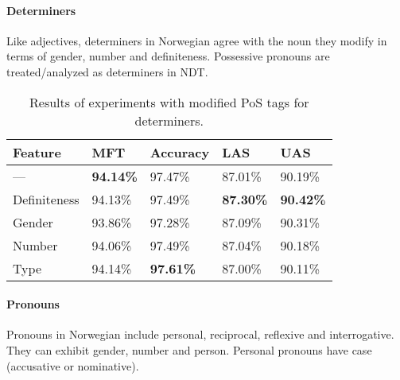 \documentclass[11pt,a4paper]{article}
\begin{document}
\paragraph{Determiners}
Like adjectives, determiners in Norwegian agree with the noun they modify in
terms of gender, number and definiteness. Possessive pronouns are
treated/analyzed as determiners in NDT.

\begin{table}
    \centering
    \smaller[0.5]
    \begin{tabular}{@{}lllll@{}}
        \toprule
        \textbf{Feature} & \textbf{MFT} & \textbf{Accuracy} &
        \textbf{LAS} & \textbf{UAS} \\
        \midrule
        --- & \textbf{94.14\%} & 97.47\% & 87.01\% & 90.19\% \\
        Definiteness & 94.13\% & 97.49\% & \textbf{87.30\%} &
        \textbf{90.42\%} \\
        Gender & 93.86\% & 97.28\% & 87.09\% & 90.31\% \\
        Number & 94.06\% & 97.49\% & 87.04\% & 90.18\% \\
        Type & 94.14\% & \textbf{97.61\%} & 87.00\% & 90.11\% \\
        \bottomrule
    \end{tabular}
    \caption{Results of experiments with modified PoS tags for determiners.}
    \label{detresults}
\end{table}

\paragraph{Pronouns}
Pronouns in Norwegian include personal, reciprocal, reflexive and
interrogative. They can exhibit gender, number and person. Personal pronouns
have case (accusative or nominative).
\end{document}
